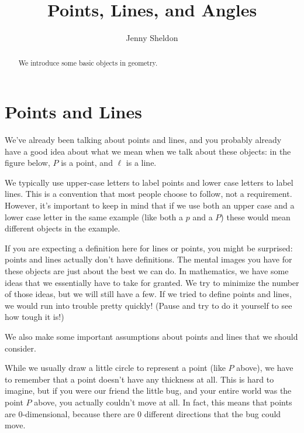 \documentclass{ximera}
\title{Points, Lines, and Angles}
\author{Jenny Sheldon}
\begin{document}
\begin{abstract}
We introduce some basic objects in geometry.
\end{abstract}
\maketitle

\section{Points and Lines}

We've already been talking about points and lines, and you probably already have a good idea about what we mean when we talk about these objects: in the figure below, $P$ is a point, and $\ell$ is a line. 
\begin{image}
\end{image}
We typically use upper-case letters to label points and lower case letters to label lines. This is a convention that most people choose to follow, not a requirement. However, it's important to keep in mind that if we use both an upper case and a lower case letter in the same example (like both a $p$ and a $P$) these would mean different objects in the example.

If you are expecting a definition here for lines or points, you might be surprised: points and lines actually don't have definitions. The mental images you have for these objects are just about the best we can do. In mathematics, we have some ideas that we essentially have to take for granted. We try to minimize the number of those ideas, but we will still have a few. If we tried to define points and lines, we would run into trouble pretty quickly! (Pause and try to do it yourself to see how tough it is!)

We also make some important assumptions about points and lines that we should consider.

While we usually draw a little circle to represent a point (like $P$ above), we have to remember that a point doesn't have any thickness at all. This is hard to imagine, but if you were our friend the little bug, and your entire world was the point $P$ above, you actually couldn't move at all. In fact, this means that points are $0$-dimensional, because there are $0$ different directions that the bug could move.
\end{document}
